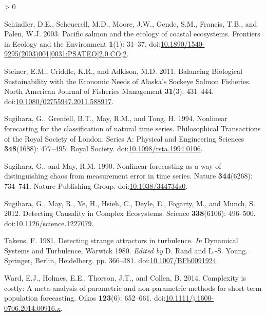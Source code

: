 \documentclass[
]{article}
\newlength{\cslhangindent}
\newenvironment{CSLReferences}[2] %
 {%
  \setlength{\parindent}{0pt}
  \ifodd #1 \everypar{\setlength{\hangindent}{\cslhangindent}}\ignorespaces\fi
  \ifnum #2 > 0
  \setlength{\parskip}{#2\baselineskip}
  \fi
 }%
 {}
\begin{document}
\begin{CSLReferences}{1}{0}
\leavevmode\hypertarget{ref-schindler2003}{}%
Schindler, D.E., Scheuerell, M.D., Moore, J.W., Gende, S.M., Francis, T.B., and Palen, W.J. 2003. Pacific salmon and the ecology of coastal ecosystems. Frontiers in Ecology and the Environment \textbf{1}(1): 31--37. doi:\href{https://doi.org/10.1890/1540-9295(2003)001\%5B0031:PSATEO\%5D2.0.CO;2}{10.1890/1540-9295(2003)001{[}0031:PSATEO{]}2.0.CO;2}.

\leavevmode\hypertarget{ref-steiner2011}{}%
Steiner, E.M., Criddle, K.R., and Adkison, M.D. 2011. Balancing {Biological Sustainability} with the {Economic Needs} of {Alaska}'s {Sockeye Salmon Fisheries}. North American Journal of Fisheries Management \textbf{31}(3): 431--444. doi:\href{https://doi.org/10.1080/02755947.2011.588917}{10.1080/02755947.2011.588917}.

\leavevmode\hypertarget{ref-sugihara1994}{}%
Sugihara, G., Grenfell, B.T., May, R.M., and Tong, H. 1994. Nonlinear forecasting for the classification of natural time series. Philosophical Transactions of the Royal Society of London. Series A: Physical and Engineering Sciences \textbf{348}(1688): 477--495. {Royal Society}. doi:\href{https://doi.org/10.1098/rsta.1994.0106}{10.1098/rsta.1994.0106}.

\leavevmode\hypertarget{ref-sugihara1990}{}%
Sugihara, G., and May, R.M. 1990. Nonlinear forecasting as a way of distinguishing chaos from measurement error in time series. Nature \textbf{344}(6268): 734--741. {Nature Publishing Group}. doi:\href{https://doi.org/10.1038/344734a0}{10.1038/344734a0}.

\leavevmode\hypertarget{ref-sugihara2012}{}%
Sugihara, G., May, R., Ye, H., Hsieh, C., Deyle, E., Fogarty, M., and Munch, S. 2012. Detecting {Causality} in {Complex Ecosystems}. Science \textbf{338}(6106): 496--500. doi:\href{https://doi.org/10.1126/science.1227079}{10.1126/science.1227079}.

\leavevmode\hypertarget{ref-takens1981}{}%
Takens, F. 1981. Detecting strange attractors in turbulence. \emph{In} Dynamical {Systems} and {Turbulence}, {Warwick} 1980. \emph{Edited by} D. Rand and L.-S. Young. {Springer}, {Berlin, Heidelberg}. pp. 366--381. doi:\href{https://doi.org/10.1007/BFb0091924}{10.1007/BFb0091924}.

\leavevmode\hypertarget{ref-ward2014}{}%
Ward, E.J., Holmes, E.E., Thorson, J.T., and Collen, B. 2014. Complexity is costly: A meta-analysis of parametric and non-parametric methods for short-term population forecasting. Oikos \textbf{123}(6): 652--661. doi:\href{https://doi.org/10.1111/j.1600-0706.2014.00916.x}{10.1111/j.1600-0706.2014.00916.x}.


\end{CSLReferences}
\end{document}
